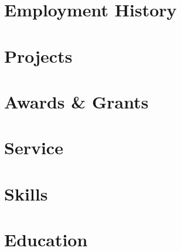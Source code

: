 \documentclass[8pt]{resume}
\begin{document}
\maketitle

\section{Employment History}














\section{Projects}












\section{Awards \& Grants}




\section{Service}


\section{Skills}








\section{Education}



\end{document}
